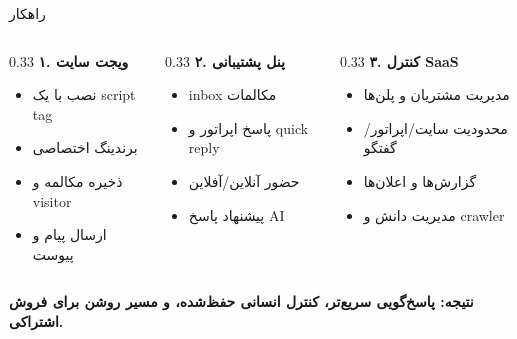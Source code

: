 \documentclass[aspectratio=169,12pt]{beamer}
\begin{document}
\begin{frame}{راهکار}
  \begin{columns}[T,totalwidth=\textwidth]
    \begin{column}{0.33\textwidth}
      \textbf{\color{primary}۱. ویجت سایت}
      \begin{itemize}
        \item نصب با یک script tag
        \item برندینگ اختصاصی
        \item ذخیره مکالمه و visitor
        \item ارسال پیام و پیوست
      \end{itemize}
    \end{column}
    \begin{column}{0.33\textwidth}
      \textbf{\color{primary}۲. پنل پشتیبانی}
      \begin{itemize}
        \item inbox مکالمات
        \item پاسخ اپراتور و quick reply
        \item حضور آنلاین/آفلاین
        \item پیشنهاد پاسخ AI
      \end{itemize}
    \end{column}
    \begin{column}{0.33\textwidth}
      \textbf{\color{primary}۳. کنترل SaaS}
      \begin{itemize}
        \item مدیریت مشتریان و پلن‌ها
        \item محدودیت سایت/اپراتور/گفتگو
        \item گزارش‌ها و اعلان‌ها
        \item مدیریت دانش و crawler
      \end{itemize}
    \end{column}
  \end{columns}

  \vspace{6mm}
  \begin{center}
    \Large\bfseries\color{accent}
    نتیجه: پاسخ‌گویی سریع‌تر، کنترل انسانی حفظ‌شده، و مسیر روشن برای فروش اشتراکی.
  \end{center}
\end{frame}
\end{document}
